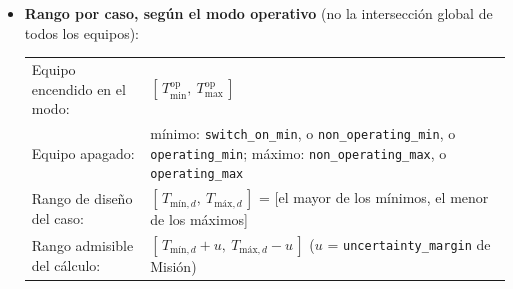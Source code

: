 \documentclass[11pt,a4paper]{article}
\newcommand{\code}[1]{\texttt{#1}}
\begin{document}
\begin{itemize}
  \item \textbf{Rango por caso, según el modo operativo} (no la intersección global de todos los equipos):

  {\small
  \begin{tabular}{@{}P{4.2cm}P{10.5cm}@{}}
  Equipo encendido en el modo: & $[\,T^\mathrm{op}_\mathrm{min},\ T^\mathrm{op}_\mathrm{max}\,]$ \\
  Equipo apagado: & mínimo: \code{switch\_on\_min}, o \code{non\_operating\_min}, o \code{operating\_min}; \newline máximo: \code{non\_operating\_max}, o \code{operating\_max} \\
  Rango de diseño del caso: & $[\,T_{\text{mín},d},\ T_{\text{máx},d}\,]$ = [el mayor de los mínimos, el menor de los máximos] \\
  Rango admisible del cálculo: & $[\,T_{\text{mín},d} + u,\ T_{\text{máx},d} - u\,]$ \quad ($u$ = \code{uncertainty\_margin} de Misión)
  \end{tabular}
  }


\end{itemize}
\end{document}
